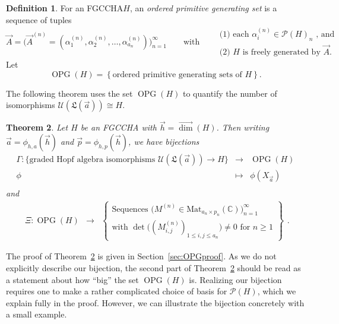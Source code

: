 \documentclass[11pt]{amsart}
\newtheorem{theorem}{Theorem}[section]
\theoremstyle{definition}
\newtheorem{definition}[theorem]{Definition}
\numberwithin{equation}{section}
\def\CC{{\mathbb C}}
\newcommand{\FGCCHA}{\textsf{FGCCHA}\xspace}
\newcommand{\vecdim}{\overrightarrow{\dim}}
\newcommand{\OPG}{\operatorname{OPG}}
\newcommand{\lucas}[1]{\todo[size=\tiny,color=red!50]{#1 \\ \hfill --- Lucas}}
\begin{document}
\begin{definition}
\label{def:OPG}
For an \FGCCHA $H$, an \emph{ordered primitive generating set} is a sequence of tuples
\[
\vec{A} = \Big(\vec{A}^{(n)} = (\alpha_{1}^{(n)}, \alpha_{2}^{(n)}, \ldots, \alpha_{a_{n}}^{(n)})\Big)_{n = 1}^{\infty}
\qquad\text{with}\qquad
\begin{array}{l}
\text{(1) each $\alpha_{i}^{(n)} \in \mathcal{P}(H)_{n}$ , and} \\
\text{(2) $H$ is freely generated by $\vec{A}$.}
\end{array}
\]
Let
\[
\OPG(H) = \left\{ \text{ordered primitive generating sets of $H$} \right\}.
\]
\end{definition}

The following theorem uses the set $\OPG(H)$ to quantify the number of isomorphisms  $\mathcal{U}(\mathfrak{L}(\vec{a})) \cong H$.

\begin{theorem}
\label{thm:OPGmaps}
Let $H$ be an \FGCCHA with $\vec{h} = \vecdim(H)$.  Then writing $\vec{a} = \phi_{h, a}(\vec{h})$ and $\vec{p} = \phi_{h, p}(\vec{h})$, we have bijections
\[
\begin{array}{rcl}
\Gamma: \{\text{graded Hopf algebra isomorphisms $\mathcal{U}(\mathfrak{L}(\vec{a})) \to H$}\} & \to & \OPG(H) \\
\phi & \mapsto & \phi(X_{\vec{a}}) \\
\end{array}
\]
and %
\[
\begin{array}{rcl}
\Xi: \OPG(H) &\to& \left\{ \begin{array}{c}
\text{Sequences $\big(M^{(n)} \in \mathrm{Mat}_{a_{n} \times p_{n}}(\CC)\big)_{n=1}^{\infty}$ } \\
\text{with $\det\big( (M^{(n)}_{i, j})_{1 \le i, j \le a_{n}} \big) \neq 0$ for $n \ge 1$}
\end{array}\right\}
\end{array}.
\]
\end{theorem}

The proof of Theorem~\ref{thm:OPGmaps} is given in Section~\ref{sec:OPGproof}.  
As we do not explicitly describe our bijection, the second part of Theorem~\ref{thm:OPGmaps} should be read as a statement about how ``big'' the set $\OPG(H)$ is.  
Realizing our bijection requires one to make a rather complicated choice of basis for $\mathcal{P}(H)$, which we explain fully in the proof.  
However, we can illustrate the bijection concretely with a small example.  
\end{document}

